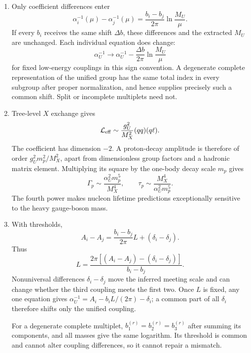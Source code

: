 \begin{enumerate}
  \begin{enumerate}
    \item[(a)]
    Only coefficient differences enter
    \[
      \alpha_i^{-1}(\mu)-\alpha_j^{-1}(\mu)
        =\frac{b_i-b_j}{2\pi}\ln\frac{M_U}{\mu}.
    \]
    If every \(b_i\) receives the same shift \(\Delta b\), these
    differences and the extracted \(M_U\) are unchanged.  Each individual
    equation does change:
    \[
      \alpha_U^{-1}\longrightarrow
      \alpha_U^{-1}
        -\frac{\Delta b}{2\pi}\ln\frac{M_U}{\mu}
    \]
    for fixed low-energy couplings in this sign convention.
    A degenerate complete representation of the unified group has the same
    total index in every subgroup after proper normalization, and hence
    supplies precisely such a common shift.  Split or incomplete
    multiplets need not.
    \item[(b)]
    Tree-level \(X\) exchange gives
    \[
      \mathcal L_{\rm eff}
        \sim\frac{g_U^2}{M_X^2}(qq)(q\ell).
    \]
    The coefficient has dimension \(-2\).  A proton-decay amplitude is
    therefore of order \(g_U^2m_p^2/M_X^2\), apart from dimensionless
    group factors and a hadronic matrix element.  Multiplying its square
    by the one-body decay scale \(m_p\) gives
    \[
      \boxed{\Gamma_p\sim
        \frac{\alpha_U^2m_p^5}{M_X^4},\qquad
        \tau_p\sim\frac{M_X^4}{\alpha_U^2m_p^5}.}
    \]
    The fourth power makes nucleon lifetime predictions exceptionally
    sensitive to the heavy gauge-boson mass.
    \item[(c)]
    With thresholds,
    \[
      A_i-A_j
        =\frac{b_i-b_j}{2\pi}L+(\delta_i-\delta_j).
    \]
    Thus
    \[
      L=\frac{2\pi[(A_i-A_j)-(\delta_i-\delta_j)]}{b_i-b_j}.
    \]
    Nonuniversal differences \(\delta_i-\delta_j\) move the inferred
    meeting scale and can change whether the third coupling meets the
    first two.  Once \(L\) is fixed, any one equation gives
    \(\alpha_U^{-1}=A_i-b_iL/(2\pi)-\delta_i\); a common part of all
    \(\delta_i\) therefore shifts only the unified coupling.

    For a degenerate complete multiplet,
    \(b_1^{(r)}=b_2^{(r)}=b_3^{(r)}\) after summing its components, and all
    masses give the same logarithm.  Its threshold is common and cannot
    alter coupling differences, so it cannot repair a mismatch.
  \end{enumerate}


\end{enumerate}
